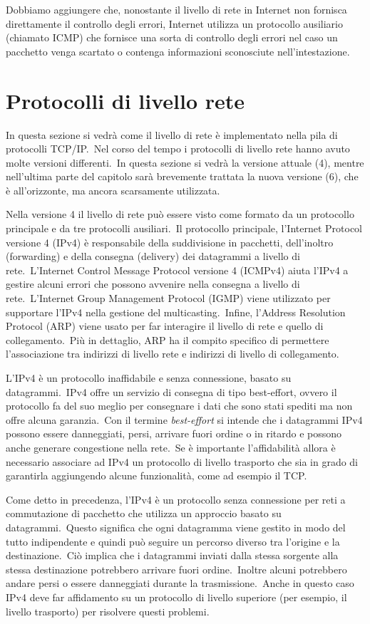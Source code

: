 Dobbiamo aggiungere che, nonostante il livello di rete in Internet non fornisca direttamente il controllo degli errori, Internet utilizza un protocollo ausiliario (chiamato ICMP) che fornisce una sorta di controllo degli errori nel caso un pacchetto venga scartato o contenga informazioni sconosciute nell'intestazione.

\section{Protocolli di livello rete}

In questa sezione si vedrà come il livello di rete è implementato nella pila di protocolli TCP/IP.\
Nel corso del tempo i protocolli di livello rete hanno avuto molte versioni differenti.\
In questa sezione si vedrà la versione attuale (4), mentre nell'ultima parte del capitolo sarà brevemente trattata la nuova versione (6), che è all'orizzonte, ma ancora scarsamente utilizzata.

Nella versione 4 il livello di rete può essere visto come formato da un protocollo principale e da tre protocolli ausiliari.\
Il protocollo principale, l'Internet Protocol versione 4 (IPv4) è responsabile della suddivisione in pacchetti, dell'inoltro (forwarding) e della consegna (delivery) dei datagrammi a livello di rete.\
L'Internet Control Message Protocol versione 4 (ICMPv4) aiuta l'IPv4 a gestire alcuni errori che possono avvenire nella consegna a livello di rete.\
L'Internet Group Management Protocol (IGMP) viene utilizzato per supportare l'IPv4 nella gestione del multicasting.\
Infine, l'Address Resolution Protocol (ARP) viene usato per far interagire il livello di rete e quello di collegamento.\
Più in dettaglio, ARP ha il compito specifico di permettere l'associazione tra indirizzi di livello rete e indirizzi di livello di collegamento.

L'IPv4 è un protocollo inaffidabile e senza connessione, basato su datagrammi.\
IPv4 offre un servizio di consegna di tipo best-effort, ovvero il protocollo fa del suo meglio per consegnare i dati che sono stati spediti ma non offre alcuna garanzia.\
Con il termine \emph{best-effort} si intende che i datagrammi IPv4 possono essere danneggiati, persi, arrivare fuori ordine o in ritardo e possono anche generare congestione nella rete.\
Se è importante l'affidabilità allora è necessario associare ad IPv4 un protocollo di livello trasporto che sia in grado di garantirla aggiungendo alcune funzionalità, come ad esempio il TCP.\

Come detto in precedenza, l'IPv4 è un protocollo senza connessione per reti a commutazione di pacchetto che utilizza un approccio basato su datagrammi.\
Questo significa che ogni datagramma viene gestito in modo del tutto indipendente e quindi può seguire un percorso diverso tra l'origine e la destinazione.\
Ciò implica che i datagrammi inviati dalla stessa sorgente alla stessa destinazione potrebbero arrivare fuori ordine.\
Inoltre alcuni potrebbero andare persi o essere danneggiati durante la trasmissione.\
Anche in questo caso IPv4 deve far affidamento su un protocollo di livello superiore (per esempio, il livello trasporto) per risolvere questi problemi.

